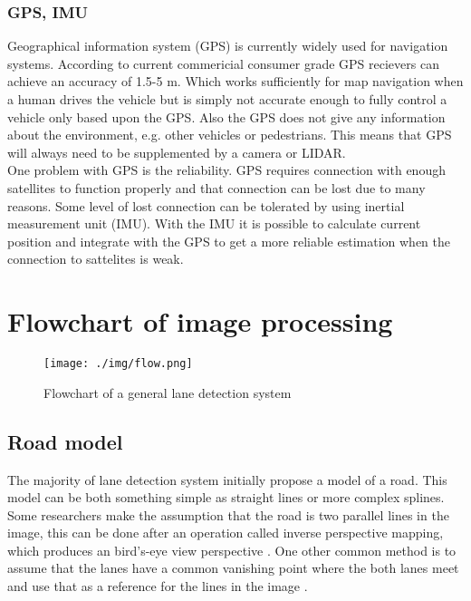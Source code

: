 \subsubsection{GPS, IMU}
Geographical information system (GPS) is currently widely used for navigation systems. According to \cite{wing2011} current commericial consumer grade GPS recievers can achieve an accuracy of 1.5-5 m. Which works sufficiently for map navigation when a human drives the vehicle but is simply not accurate enough to fully control a vehicle only based upon the GPS. Also the GPS does not give any information about the environment, e.g. other vehicles or pedestrians. This means that GPS will always need to be supplemented by a camera or LIDAR.\\
 
One problem with GPS is the reliability. GPS requires connection with enough satellites to function properly and that connection can be lost due to many reasons. Some level of lost connection can be tolerated by using inertial measurement unit (IMU). With the IMU it is possible to calculate current position and integrate with the GPS to get a more reliable estimation when the connection to sattelites is weak.



\section{Flowchart of image processing}

\begin{figure}[H]
  \texttt{[image: ./img/flow.png]}
  \centering
  \caption{Flowchart of a general lane detection system}
  \label{fig:Software architecture of the EMC2 platform}
\end{figure}


\subsection{Road model}
The majority of lane detection system initially propose a model of a road. This model can be both something simple as straight lines or more complex splines. Some researchers make the assumption that the road is two parallel lines in the image, this can be done after an operation called inverse perspective mapping, which produces an bird's-eye view  perspective \cite{bertozzi1998gold}. One other common method is to assume that the lanes have a common vanishing point where the both lanes meet and use that as a reference for the lines in the image \cite{Yenikaya:2013:KVR:2522968.2522970}\cite{jingyu2013lane}.
